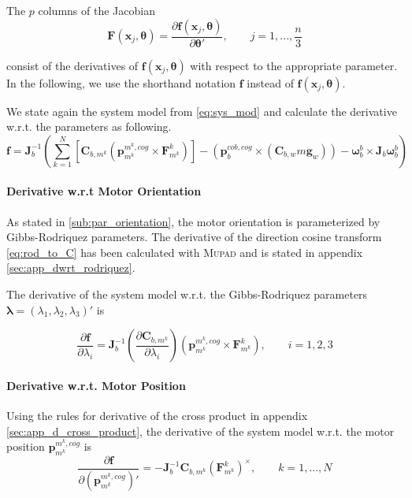 The $p$ columns of the Jacobian
\begin{equation}
\mathbf{F}(\mathbf{x}_j, \boldsymbol{\theta}) = 
\frac{\partial \mathbf{f}(\mathbf{x}_j, \boldsymbol{\theta})} {\partial \boldsymbol{\theta}'}
, \qquad j=1,...,\frac{n}{3}
\end{equation}

consist of the derivatives of $\mathbf{f}(\mathbf{x}_j, \boldsymbol{\theta})$
with respect to the appropriate parameter.
In the following, we use the shorthand notation $\mathbf{f}$
instead of $\mathbf{f}(\mathbf{x}_j, \boldsymbol{\theta})$.

We state again the system model from \cref{eq:sys_mod} and calculate the derivative w.r.t. the parameters as following.
\begin{equation}
\mathbf{f}
= \mathbf{J}_b^{-1} \left( 
\sum_{k=1}^N  \left[  \mathbf{C}_{b,m^k} \left( \mathbf{p}^{m^k,cog}_{m^k} \times \mathbf{F}^k_{m^k} \right)  \right]
-
\left( \mathbf{p}^{cob,cog}_b \times (\mathbf{C}_{b,w}m\mathbf{g}_w) \right)
- \boldsymbol{\omega}_b^b \times \mathbf{J}_b \boldsymbol{\omega}_b^b \right)
\end{equation}


\paragraph{Derivative w.r.t Motor Orientation\\}
As stated in \cref{sub:par_orientation}, the motor orientation is parameterized by Gibbs-Rodriquez parameters. The derivative of the direction cosine transform \cref{eq:rod_to_C} has been calculated with \textsc{Mupad} and is stated in appendix \ref{sec:app_dwrt_rodriquez}.

The derivative of the system model w.r.t. the Gibbs-Rodriquez parameters $\boldsymbol{\lambda} = (\lambda_1, \lambda_2, \lambda_3)'$ is

\begin{equation}
\frac{\partial \mathbf{f}}{\partial \lambda_i} =
\mathbf{J}_b^{-1} 
\left( \frac{\partial \mathbf{C}_{b,m^k}}{\partial \lambda_i} \right)
\left( \mathbf{p}^{m^k,cog}_{m^k} \times \mathbf{F}^k_{m^k} \right)
, \qquad i = 1,2,3
\end{equation}

\paragraph{Derivative w.r.t. Motor Position\\}
Using the rules for derivative of the cross product in appendix \ref{sec:app_d_cross_product}, the derivative of the system model w.r.t. the motor position $\mathbf{p}^{m^k,cog}_{m^k}$ is
\begin{equation}
\frac{\partial \mathbf{f}}{\partial (\mathbf{p}^{m^k,cog}_{m^k})'} =
- \mathbf{J}_b^{-1} 
\mathbf{C}_{b,m^k}
\left( \mathbf{F}^k_{m^k} \right) ^\times
, \qquad k = 1,...,N
\end{equation}

